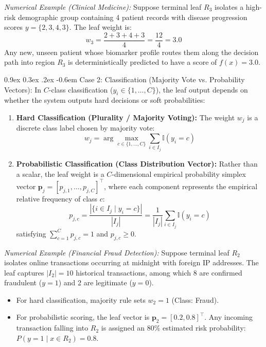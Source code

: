 \documentclass[11pt,a4paper]{article}
\makeatletter
\renewcommand\paragraph{\@startsection{paragraph}{4}{\z@}%
                                     {0.9ex \@plus0.3ex \@minus.2ex}%
                                     {-0.6em}%
                                     {\normalfont\normalsize\bfseries}}
\makeatother
\begin{document}
\emph{Numerical Example (Clinical Medicine):} Suppose terminal leaf $R_3$ isolates a high-risk demographic group containing 4 patient records with disease progression scores $y = \{2, 3, 4, 3\}$. The leaf weight is:
\begin{equation*}
    w_3 = \frac{2 + 3 + 4 + 3}{4} = \frac{12}{4} = 3.0
\end{equation*}
Any new, unseen patient whose biomarker profile routes them along the decision path into region $R_3$ is deterministically predicted to have a score of $f(x) = 3.0$.

\paragraph{Case 2: Classification (Majority Vote vs. Probability Vectors):}
In $C$-class classification ($y_i \in \{1, \dots, C\}$), the leaf output depends on whether the system outputs hard decisions or soft probabilities:
\begin{enumerate}
    \item \textbf{Hard Classification (Plurality / Majority Voting):} The weight $w_j$ is a discrete class label chosen by majority vote:
    \begin{equation}
        w_j = \arg\max_{c \in \{1, \dots, C\}} \sum_{i \in I_j} \mathbb{I}(y_i = c)
    \end{equation}
    \item \textbf{Probabilistic Classification (Class Distribution Vector):} Rather than a scalar, the leaf weight is a $C$-dimensional empirical probability simplex vector $\mathbf{p}_j = [p_{j,1}, \dots, p_{j,C}]^\top$, where each component represents the empirical relative frequency of class $c$:
    \begin{equation}
        p_{j,c} = \frac{|\{ i \in I_j \mid y_i = c \}|}{|I_j|} = \frac{1}{|I_j|} \sum_{i \in I_j} \mathbb{I}(y_i = c)
    \end{equation}
    satisfying $\sum_{c=1}^C p_{j,c} = 1$ and $p_{j,c} \ge 0$.
\end{enumerate}

\emph{Numerical Example (Financial Fraud Detection):} Suppose terminal leaf $R_2$ isolates online transactions occurring at midnight with foreign IP addresses. The leaf captures $|I_2| = 10$ historical transactions, among which 8 are confirmed fraudulent ($y = 1$) and 2 are legitimate ($y = 0$). 
\begin{itemize}
    \item For hard classification, majority rule sets $w_2 = 1$ (Class: Fraud).
    \item For probabilistic scoring, the leaf vector is $\mathbf{p}_2 = [0.2, 0.8]^\top$. Any incoming transaction falling into $R_2$ is assigned an $80\%$ estimated risk probability: $P(y = 1 \mid x \in R_2) = 0.8$.
\end{itemize}
\end{document}
